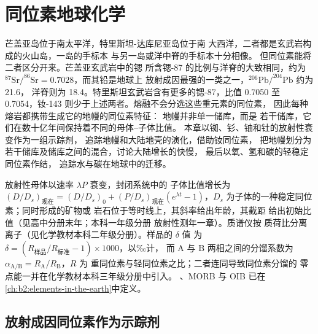 \chapter{同位素地球化学}\label{ch:b2:isotope-geochemistry}

芒盖亚岛位于南太平洋，特里斯坦-达库尼亚岛位于南
大西洋，二者都是玄武岩构成的火山岛，一岛的手标本
与另一岛或洋中脊的手标本十分相像。
但同位素能将二者区分开来。芒盖亚玄武岩中的锶
所含锶-87 的比例与洋脊的大致相同，约为
$^{87}\mathrm{Sr}/^{86}\mathrm{Sr} = 0.7028$，而其铅是地球上
放射成因最强的一类之一，$^{206}\mathrm{Pb}/^{204}\mathrm{Pb}$ 约为 21.6，
洋脊则为 18.4。特里斯坦玄武岩含有更多的锶-87，比值 0.7050 至
0.7054，钕-143 则少于上述两者。熔融不会分选这些重元素的同位素，
因此每种熔岩都携带生成它的地幔的同位素特征：
地幔并非单一储库，而是
若干储库，它们在数十亿年间保持着不同的母体–子体比值。
本章以铷、钐、铀和钍的放射性衰变作为一组示踪剂，
追踪地幔和大陆地壳的演化，借助钕同位素，
把地幔划分为
若干储库及储库之间的混合，讨论大陆增长的快慢，
最后以氧、氢和碳的轻稳定同位素作结，
追踪水与碳在地球中的迁移。

\begin{recall}
放射性母体以速率 $\lambda P$ 衰变，封闭系统中的
子体比值增长为 $(D/D_s)_{\text{现在}} = (D/D_s)_0 + (P/D_s)_{\text{现在}}
(e^{\lambda t}-1)$，$D_s$ 为子体的一种稳定同位素；同时形成的矿物或
岩石位于等时线上，其斜率给出年龄，其截距
给出初始比值（见高中分册末年；本科一年级分册
放射性测年一章）。质谱仪按
质荷比分离离子（见化学教材本科二年级分册）。样品的 $\delta$ 值
为 $\delta = (R_{\text{样品}}/R_{\text{标准}} - 1)\times 1000$，以‰计，
而 A 与 B 两相之间的分馏系数为
$\alpha_{\mathrm{A/B}} = R_{\mathrm A}/R_{\mathrm B}$，$R$ 为
重同位素与轻同位素之比；二者连同导致同位素分馏的
零点能一并在化学教材本科三年级分册中引入。
、MORB 与 OIB 已在
\cref{ch:b2:elements-in-the-earth}中定义。
\end{recall}

\section{放射成因同位素作为示踪剂}

